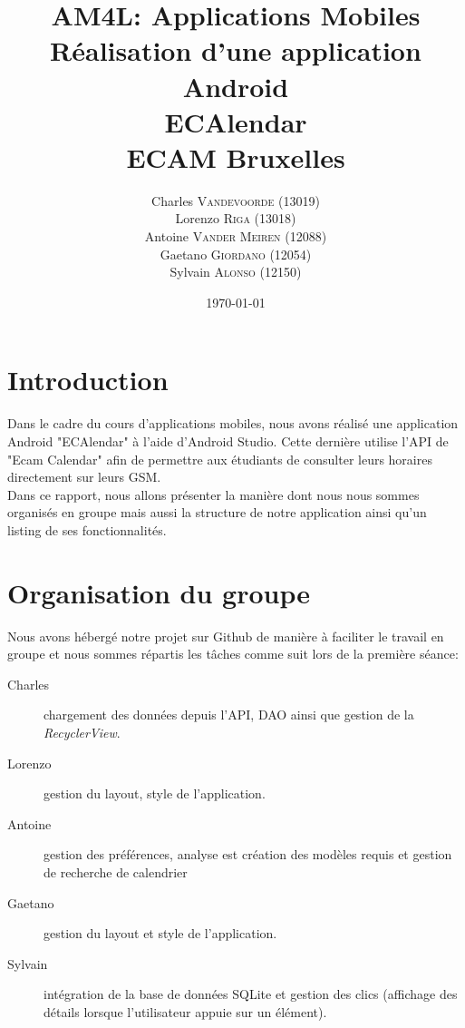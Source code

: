 \documentclass{article}
\title{AM4L: Applications Mobiles \\ Réalisation d'une application Android \\ ECAlendar \\
\vspace{1cm} \large{ECAM Bruxelles} \vspace{5cm}}
\author{Charles \textsc{Vandevoorde} (13019)\\
		Lorenzo \textsc{Riga} (13018)\\
		Antoine \textsc{Vander Meiren} (12088)\\
		Gaetano \textsc{Giordano} (12054)\\
		Sylvain \textsc{Alonso} (12150)\\}
\date{\vspace{5cm}\today}
\begin{document}
	\maketitle
    \newpage


	\section{Introduction}
    Dans le cadre du cours d'applications mobiles, nous avons réalisé une application Android
    "ECAlendar" à l'aide d'Android Studio. Cette dernière utilise l'API de "Ecam Calendar" afin de
    permettre aux étudiants de consulter leurs horaires directement sur leurs GSM.\\

    Dans ce rapport, nous allons présenter la manière dont nous nous sommes organisés en groupe mais
    aussi la structure de notre application ainsi qu'un listing de ses fonctionnalités.

	\section{Organisation du groupe}
	\hspace{0.45cm}
     Nous avons hébergé notre projet sur Github de manière à faciliter le travail en groupe et nous
     sommes répartis les tâches comme suit lors de la première séance:
	 \begin{description}
         \item[Charles] chargement des données depuis l'API, DAO ainsi que gestion de la
             \textit{RecyclerView}.
         \item[Lorenzo] gestion du layout, style de l'application.
         \item[Antoine] gestion des préférences, analyse est création des modèles requis et gestion de recherche de calendrier
         \item[Gaetano] gestion du layout et style de l'application.
         \item[Sylvain] intégration de la base de données SQLite et gestion des clics (affichage des détails lorsque l'utilisateur appuie sur un élément).
	 \end{description}
\end{document}
